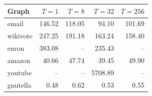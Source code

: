 \begin{tabular}{lrrrr}
\toprule
Graph & $T{=}1$ & $T{=}8$ & $T{=}32$ & $T{=}256$ \\
\midrule
email & 146.52 & 118.05 & 94.10 & 101.69 \\
wikivote & 247.25 & 191.18 & 163.24 & 158.40 \\
enron & 383.08 & -- & 235.43 & -- \\
amazon & 40.66 & 47.74 & 39.45 & 49.90 \\
youtube & -- & -- & 5708.89 & -- \\
gnutella & 0.48 & 0.62 & 0.53 & 0.55 \\
\bottomrule
\end{tabular}
